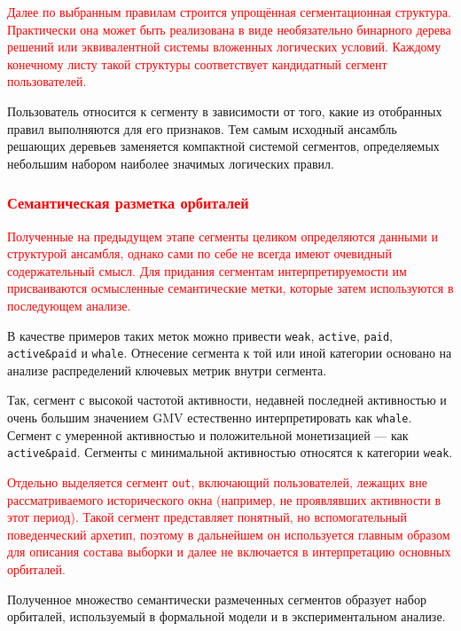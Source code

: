 \textcolor{red}{
Далее по выбранным правилам строится упрощённая сегментационная
структура. Практически она может быть реализована в виде
необязательно бинарного дерева решений или эквивалентной системы
вложенных логических условий. Каждому конечному листу такой структуры
соответствует кандидатный сегмент пользователей.
}

Пользователь относится к сегменту в зависимости от того, какие из
отобранных правил выполняются для его признаков. Тем самым исходный
ансамбль решающих деревьев заменяется компактной системой сегментов,
определяемых небольшим набором наиболее значимых логических правил.

\subsubsection{\textcolor{red}{Семантическая разметка орбиталей}}
\label{subsubsec:semantic_labeling}

\textcolor{red}{
Полученные на предыдущем этапе сегменты целиком определяются данными
и структурой ансамбля, однако сами по себе не всегда имеют очевидный
содержательный смысл. Для придания сегментам интерпретируемости им
присваиваются осмысленные семантические метки, которые затем
используются в последующем анализе.}

В качестве примеров таких меток можно привести
\texttt{weak}, \texttt{active}, \texttt{paid},
\texttt{active\&paid} и \texttt{whale}. Отнесение сегмента к той или
иной категории основано на анализе распределений ключевых метрик
внутри сегмента.

Так, сегмент с высокой частотой активности, недавней последней
активностью и очень большим значением GMV естественно интерпретировать
как \texttt{whale}. Сегмент с умеренной активностью и положительной
монетизацией — как \texttt{active\&paid}. Сегменты с минимальной
активностью относятся к категории \texttt{weak}.

\textcolor{red}{
Отдельно выделяется сегмент \texttt{out}, включающий пользователей,
лежащих вне рассматриваемого исторического окна (например, не
проявлявших активности в этот период). Такой сегмент представляет
понятный, но вспомогательный поведенческий архетип, поэтому в дальнейшем
он используется главным образом для описания состава выборки и далее
не включается в интерпретацию основных орбиталей.
}

Полученное множество семантически размеченных сегментов образует
набор орбиталей, используемый в формальной модели и в
экспериментальном анализе.

